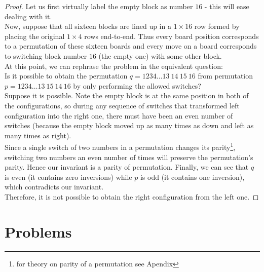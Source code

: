 \documentclass[11pt,a5paper]{article}
\begin{document}
\begin{proof}
Let us first virtually label the empty block as number $16$ - this will ease dealing with it. \\
Now, suppose that all sixteen blocks are lined up in a $1\times16$ row formed by placing the original $1\times4$ rows end-to-end. Thus every board position corresponds to a permutation of these sixteen boards and every move on a board corresponds to switching block number $16$ (the empty one) with some other block.\\
At this point, we can rephrase the problem in the equivalent question: \\
Is it possible to obtain the permutation $q = 1234\dots13\ 14\ 15\ 16$ from permutation $p = 1234\dots13\ 15\ 14\ 16$ by only performing the allowed switches?\\
Suppose it is possible. Note the empty block is at the same position in both of the configurations, so during any sequence of switches that transformed left configuration into the right one, there must have been an even number of switches (because the empty block moved up as many times as down and left as many times as right). \\
Since a single switch of two numbers in a permutation changes its parity\footnote{for theory on parity of a permutation see Apendix}, switching two numbers an even number of times will preserve the permutation's parity. Hence our invariant is a parity of permutation.
Finally, we can see that $q$ is even (it contains zero inversions) while $p$ is odd (it contains one inversion), which contradicts our invariant.\\
Therefore, it is not possible to obtain the right configuration from the left one.

\end{proof}

\section{Problems}
\end{document}
